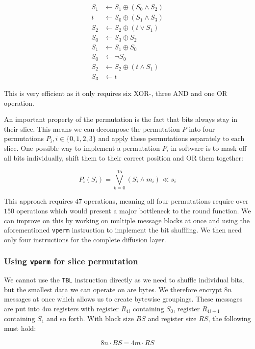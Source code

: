 \begin{align*}
    S_1&\leftarrow S_1\oplus (S_0\land S_2) \\
    t&\leftarrow S_0\oplus (S_1\land S_3) \\
    S_2&\leftarrow S_2\oplus (t\lor S_1) \\
    S_0&\leftarrow S_3\oplus S_2 \\
    S_1&\leftarrow S_1\oplus S_0 \\
    S_0&\leftarrow \lnot S_0 \\
    S_2&\leftarrow S_2\oplus (t\land S_1) \\
    S_3&\leftarrow t
\end{align*}

This is very efficient as it only requires six XOR-, three AND and one OR
operation.

An important property of the permutation is the fact that bits always stay in
their slice. This means we can decompose the permutation $P$ into four
permutations $P_i,i\in\{0,1,2,3\}$ and apply these permutations
separately to each slice. One possible way to implement a permutation $P_i$ in
software is to mask off all bits individually, shift them to their correct
position and OR them together:

\[
    P_i(S_i)=\bigvee_{k=0}^{15}{(S_i\land m_i) \ll s_i}
\]

This approach requires $47$ operations, meaning all four permutations require
over $150$ operations which would present a major bottleneck to the round
function. We can improve on this by working on multiple message blocks at once
and using the aforementioned \texttt{vperm} instruction to implement the bit
shuffling. We then need only four instructions for the complete diffusion
layer.

\subsubsection{Using \texttt{vperm} for slice permutation}

We cannot use the \texttt{TBL} instruction directly as we need to shuffle
individual bits, but the smallest data we can operate on are bytes. We
therefore encrypt $8n$ messages at once which allows us to create bytewise
groupings. These messages are put into $4m$ registers with register $R_{4i}$
containing $S_0$, register $R_{4i+1}$ containing $S_1$ and so forth. With block
size $BS$ and register size $RS$, the following must hold:

\[
    8n\cdot BS=4m\cdot RS
\]

